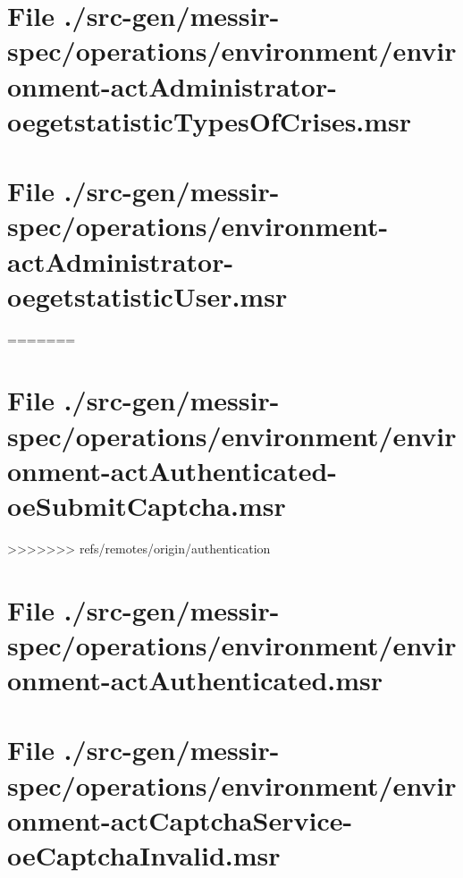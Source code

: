 \section[File /src-gen.../environment-actAdministrator-oegetstatisticTypesOfCrises.msr]{File ./src-gen/messir-spec/operations/environment/environment-actAdministrator-oegetstatisticTypesOfCrises.msr}
\scriptsize

\normalsize
	
\section[File /src-gen.../environment-actAdministrator-oegetstatisticUser.msr]{File ./src-gen/messir-spec/operations/environment-actAdministrator-oegetstatisticUser.msr}
\scriptsize

=======
\section[File /src-gen/messir-spec.../environment-actAuthenticated-oeSubmitCaptcha.msr]{File ./src-gen/messir-spec/operations/environment/environment-actAuthenticated-oeSubmitCaptcha.msr}
\scriptsize

>>>>>>> refs/remotes/origin/authentication
\normalsize
	
\section[File /src-gen/messir-spec/operations.../environment-actAuthenticated.msr]{File ./src-gen/messir-spec/operations/environment/environment-actAuthenticated.msr}
\scriptsize

\normalsize
	
\section[File /src-gen/messir-spec.../environment-actCaptchaService-oeCaptchaInvalid.msr]{File ./src-gen/messir-spec/operations/environment/environment-actCaptchaService-oeCaptchaInvalid.msr}
\scriptsize

\normalsize
	
